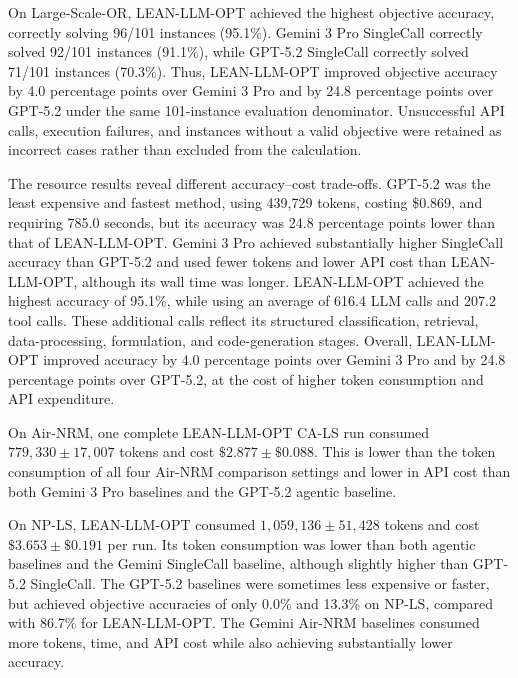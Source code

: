 \documentclass[11pt]{article}
\begin{document}
\begin{enumerate}[label=(AssoE.\arabic*),leftmargin=*]
\begin{enumerate}[label=(R2.Major.\arabic*),leftmargin=*]


On Large-Scale-OR, LEAN-LLM-OPT achieved the highest objective accuracy,
correctly solving 96/101 instances (95.1\%). Gemini 3 Pro SingleCall
correctly solved 92/101 instances (91.1\%), while GPT-5.2 SingleCall correctly
solved 71/101 instances (70.3\%). Thus, LEAN-LLM-OPT improved objective
accuracy by 4.0 percentage points over Gemini 3 Pro and by 24.8 percentage
points over GPT-5.2 under the same 101-instance evaluation denominator.
Unsuccessful API calls, execution failures, and instances without a valid
objective were retained as incorrect cases rather than excluded from the
calculation.

The resource results reveal different accuracy--cost trade-offs. GPT-5.2 was
the least expensive and fastest method, using 439,729 tokens, costing
\$0.869, and requiring 785.0 seconds, but its accuracy was 24.8 percentage
points lower than that of LEAN-LLM-OPT. Gemini 3 Pro achieved substantially
higher SingleCall accuracy than GPT-5.2 and used fewer tokens and lower API
cost than LEAN-LLM-OPT, although its wall time was longer. LEAN-LLM-OPT
achieved the highest accuracy of 95.1\%, while using an average of 616.4 LLM
calls and 207.2 tool calls. These additional calls reflect its structured
classification, retrieval, data-processing, formulation, and code-generation
stages. Overall, LEAN-LLM-OPT improved accuracy by 4.0 percentage points over
Gemini 3 Pro and by 24.8 percentage points over GPT-5.2, at the cost of
higher token consumption and API expenditure.

On Air-NRM, one complete LEAN-LLM-OPT CA-LS run consumed
$779{,}330\pm17{,}007$ tokens and cost
$\$2.877\pm\$0.088$. This is lower than the token consumption of all four
Air-NRM comparison settings and lower in API cost than both Gemini 3 Pro
baselines and the GPT-5.2 agentic baseline.

On NP-LS, LEAN-LLM-OPT consumed
$1{,}059{,}136\pm51{,}428$ tokens and cost
$\$3.653\pm\$0.191$ per run. Its token consumption was lower than both
agentic baselines and the Gemini SingleCall baseline, although slightly higher
than GPT-5.2 SingleCall. The GPT-5.2 baselines were sometimes less expensive
or faster, but achieved objective accuracies of only 0.0\% and 13.3\% on
NP-LS, compared with 86.7\% for LEAN-LLM-OPT. The Gemini Air-NRM baselines
consumed more tokens, time, and API cost while also achieving substantially
lower accuracy.


\end{enumerate}
\end{enumerate}
\end{document}
